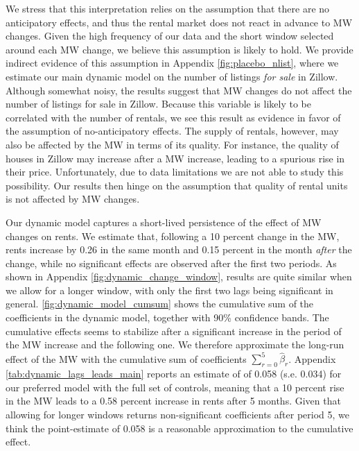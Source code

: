 We stress that this interpretation relies on the assumption that there are no anticipatory
effects, and thus the rental market does not react in advance to MW changes. Given the high 
frequency of our data and the short window selected around each MW change, we believe this 
assumption is likely to hold. We provide indirect evidence of this assumption in Appendix 
\autoref{fig:placebo_nlist}, where we estimate our main dynamic model on the number of listings 
\textit{for sale} in Zillow. Although somewhat noisy, the results suggest that MW changes do 
not affect the number of listings for sale in Zillow. Because this variable is likely to be 
correlated with the number of rentals, we see this result as evidence in favor of the 
assumption of no-anticipatory effects. The supply of rentals, however, may also be affected 
by the MW in terms of its quality. For instance, the quality of houses in Zillow may increase 
after a MW increase, leading to a spurious rise in their price. Unfortunately, due to data 
limitations we are not able to study this possibility. Our results then hinge on the assumption 
that quality of rental units is not affected by MW changes.

Our dynamic model captures a short-lived persistence of the effect of MW changes on rents. We 
estimate that, following a 10 percent change in the MW, rents increase by 0.26 in the same month 
and 0.15 percent in the month \textit{after} the change, while no significant effects are 
observed after the first two periods. As shown in Appendix \autoref{fig:dynamic_change_window}, results 
are quite similar when we allow for a longer window, with only the first two lags being 
significant in general.
\autoref{fig:dynamic_model_cumsum} shows the cumulative sum of the coefficients in the dynamic 
model, together with 90\% confidence bands. The cumulative effects seems to stabilize after a 
significant increase in the period of the MW increase and the following one. We therefore 
approximate the long-run effect of the MW with the cumulative sum of coefficients 
$\sum_{r=0}^{5} \hat{\beta}_{r}$. Appendix \autoref{tab:dynamic_lags_leads_main} reports an 
estimate of of 0.058 (s.e. 0.034) for our preferred model with the full set of controls, 
meaning that a 10 percent rise in the MW leads to a 0.58 percent increase in rents after 5 
months. Given that allowing for longer windows returns non-significant coefficients after period 
5, we think the point-estimate of 0.058 is a reasonable approximation to the cumulative effect.

